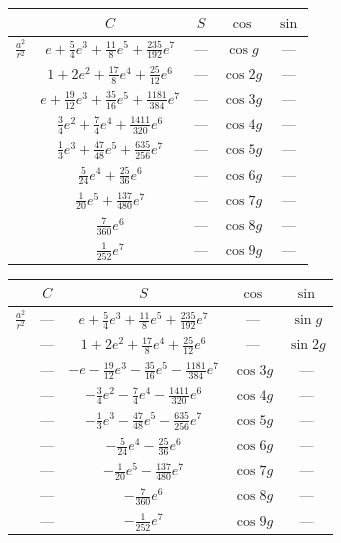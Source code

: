\documentclass[11pt,a4paper]{article}
\theoremstyle{plain}
\theoremstyle{definition}
\theoremstyle{remark}
\begin{document}
\begin{center}
\begin{tabular}{|c|c|c|c|c|}
\hline
& $C$ & $S$ & $\cos$ & $\sin$ \\
\hline
$\frac{a^2}{r^2}$ & $e + \frac{5}{4}e^3 + \frac{11}{8}e^5 + \frac{235}{192}e^7$ & --- & $\cos g$ & --- \\
& $1 + 2e^2 + \frac{17}{8}e^4 + \frac{25}{12}e^6$ & --- & $\cos 2g$ & --- \\
& $e + \frac{19}{12}e^3 + \frac{35}{16}e^5 + \frac{1181}{384}e^7$ & --- & $\cos 3g$ & --- \\
& $\frac{3}{4}e^2 + \frac{7}{4}e^4 + \frac{1411}{320}e^6$ & --- & $\cos 4g$ & --- \\
& $\frac{1}{3}e^3 + \frac{47}{48}e^5 + \frac{635}{256}e^7$ & --- & $\cos 5g$ & --- \\
& $\frac{5}{24}e^4 + \frac{25}{36}e^6$ & --- & $\cos 6g$ & --- \\
& $\frac{1}{20}e^5 + \frac{137}{480}e^7$ & --- & $\cos 7g$ & --- \\
& $\frac{7}{360}e^6$ & --- & $\cos 8g$ & --- \\
& $\frac{1}{252}e^7$ & --- & $\cos 9g$ & --- \\
\hline
\end{tabular}
\end{center}

\vspace{1em}

\begin{center}
\begin{tabular}{|c|c|c|c|c|}
\hline
& $C$ & $S$ & $\cos$ & $\sin$ \\
\hline
$\frac{a^2}{r^2}$ & --- & $e + \frac{5}{4}e^3 + \frac{11}{8}e^5 + \frac{235}{192}e^7$ & --- & $\sin g$ \\
& --- & $1 + 2e^2 + \frac{17}{8}e^4 + \frac{25}{12}e^6$ & --- & $\sin 2g$ \\
& --- & $-e - \frac{19}{12}e^3 - \frac{35}{16}e^5 - \frac{1181}{384}e^7$ & $\cos 3g$ & --- \\
& --- & $- \frac{3}{4}e^2 - \frac{7}{4}e^4 - \frac{1411}{320}e^6$ & $\cos 4g$ & --- \\
& --- & $- \frac{1}{3}e^3 - \frac{47}{48}e^5 - \frac{635}{256}e^7$ & $\cos 5g$ & --- \\
& --- & $- \frac{5}{24}e^4 - \frac{25}{36}e^6$ & $\cos 6g$ & --- \\
& --- & $- \frac{1}{20}e^5 - \frac{137}{480}e^7$ & $\cos 7g$ & --- \\
& --- & $- \frac{7}{360}e^6$ & $\cos 8g$ & --- \\
& --- & $- \frac{1}{252}e^7$ & $\cos 9g$ & --- \\
\hline
\end{tabular}
\end{center}
\end{document}
